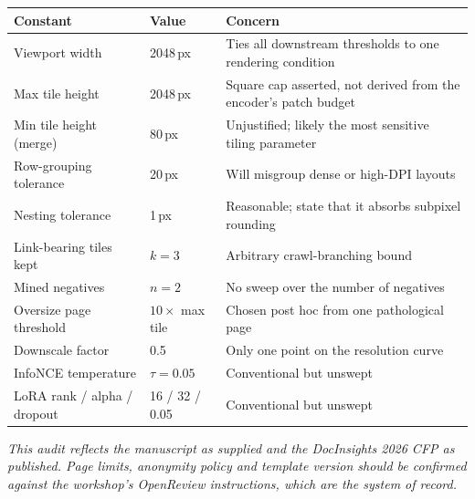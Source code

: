 \documentclass[11pt,a4paper]{article}
\begin{document}
\begin{center}
\begin{tabularx}{\textwidth}{@{}L{5.2cm}L{2.6cm}X@{}}
\toprule
\textbf{Constant} & \textbf{Value} & \textbf{Concern} \\
\midrule
Viewport width & 2048\,px & Ties all downstream thresholds to one rendering condition \\
Max tile height & 2048\,px & Square cap asserted, not derived from the encoder's patch budget \\
Min tile height (merge) & 80\,px & Unjustified; likely the most sensitive tiling parameter \\
Row-grouping tolerance & 20\,px & Will misgroup dense or high-DPI layouts \\
Nesting tolerance & 1\,px & Reasonable; state that it absorbs subpixel rounding \\
Link-bearing tiles kept & $k{=}3$ & Arbitrary crawl-branching bound \\
Mined negatives & $n{=}2$ & No sweep over the number of negatives \\
Oversize page threshold & $10\times$ max tile & Chosen post hoc from one pathological page \\
Downscale factor & 0.5 & Only one point on the resolution curve \\
InfoNCE temperature & $\tau{=}0.05$ & Conventional but unswept \\
LoRA rank / alpha / dropout & 16 / 32 / 0.05 & Conventional but unswept \\
\bottomrule
\end{tabularx}
\end{center}

\vfill
\begin{center}\footnotesize
\emph{This audit reflects the manuscript as supplied and the DocInsights 2026 CFP as
published. Page limits, anonymity policy and template version should be confirmed against
the workshop's OpenReview instructions, which are the system of record.}
\end{center}
\end{document}
